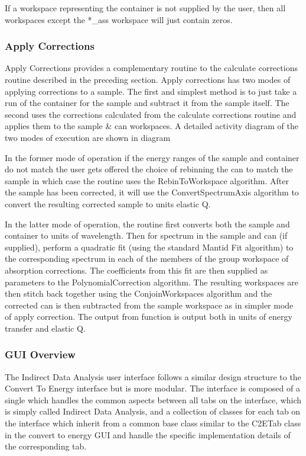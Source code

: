 \documentclass[paper=a4, fontsize=11pt]{scrartcl}	%
\numberwithin{equation}{section}															%
\numberwithin{figure}{section}																%
\numberwithin{table}{section}																%
\begin{document}
If a workspace representing the container is not supplied by the user, then all workspaces except the \**\_ass workspace will just contain zeros.

\subsubsection{Apply Corrections}
\label{subsubsec:apply-corrections}

Apply Corrections provides a complementary routine to the calculate corrections routine described in the preceding section. Apply corrections has two modes of applying corrections to a sample. The first and simplest method is to just take a run of the container for the sample and subtract it from the sample itself. The second uses the corrections calculated from the calculate corrections routine and applies them to the sample \& can workspaces. A detailed activity diagram of the two modes of execution are shown in diagram

In the former mode of operation if the energy ranges of the sample and container do not match the user gets offered the choice of rebinning the can to match the sample in which case the routine uses the RebinToWorkspace algorithm. After the sample has been corrected, it will use the ConvertSpectrumAxis algorithm to convert the resulting corrected sample to units elastic Q.

In the latter mode of operation, the routine first converts both the sample and container to units of wavelength. Then for spectrum in the sample and can (if supplied), perform a quadratic fit (using the standard Mantid Fit algorithm) to the corresponding spectrum in each of the members of the group workspace of absorption corrections. The coefficients from this fit are then supplied as parameters to the PolynomialCorrection algorithm. The resulting workspaces are then stitch back together using the ConjoinWorkspaces algorithm and the corrected can is then subtracted from the sample workspace as in simpler mode of apply correction. The output from function is output both in units of energy transfer and elastic Q.

\subsubsection{GUI Overview}
\label{subsubsec:IDA-GUI-Overview}
The Indirect Data Analysis user interface follows a similar design structure to the Convert To Energy interface but is more modular. The interface is composed of a single which handles the common aspects between all tabs on the interface, which is simply called Indirect Data Analysis, and a collection of classes for each tab on the interface which inherit from a common base class similar to the C2ETab class in the convert to energy GUI and handle the specific implementation details of the corresponding tab.
\end{document}
